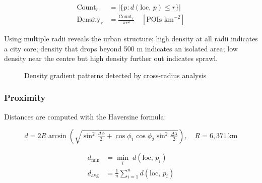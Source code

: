\documentclass[11pt,a4paper]{article}
\begin{document}
\begin{align}
\text{Count}_r   &= \bigl|\{p : d(\text{loc},\,p) \le r\}\bigr| \\[4pt]
\text{Density}_r &= \frac{\text{Count}_r}{\pi r^2} \quad [\text{POIs km}^{-2}]
\end{align}

Using multiple radii reveals the urban structure: high density at all radii indicates a city core; density that drops beyond 500 m indicates an isolated area; low density near the centre but high density further out indicates sprawl.

\begin{figure}[H]
\centering
{}
\caption{Density gradient patterns detected by cross-radius analysis}
\end{figure}

\subsubsection{Proximity}

Distances are computed with the Haversine formula:

\begin{equation}
d = 2R\arcsin\!\left(\sqrt{\sin^2\!\tfrac{\Delta\phi}{2}
    + \cos\phi_1\cos\phi_2\sin^2\!\tfrac{\Delta\lambda}{2}}\right),
    \quad R = 6{,}371\,\text{km}
\end{equation}

\begin{align}
d_{\min}  &= \min_{i}\; d(\text{loc},\,p_i) \\
d_{\text{avg}} &= \frac{1}{n}\sum_{i=1}^{n} d(\text{loc},\,p_i)
\end{align}
\end{document}

